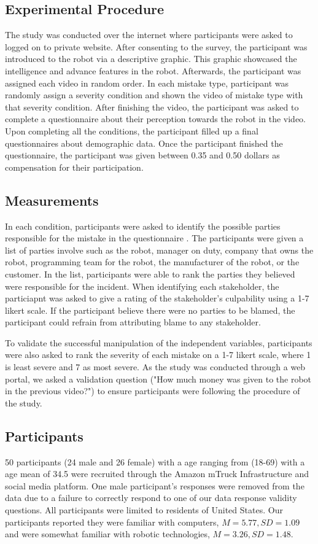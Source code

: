 \documentclass{sigchi}
\begin{document}
\subsection{Experimental Procedure}
The study was conducted over the internet where participants were asked to logged on to private website. After consenting to the survey, the participant was introduced to the robot via a descriptive graphic. This graphic showcased the intelligence and advance features in the robot. Afterwards, the participant was assigned each video in random order. In each mistake type, participant was randomly assign a severity condition and shown the video of mistake type with that severity condition. After finishing the video, the participant was asked to complete a questionnaire about their perception towards the robot in the video. Upon completing all the conditions, the participant filled up a final questionnaires about demographic data. Once the participant finished the questionnaire, the participant was given between 0.35 and 0.50 dollars as compensation for their participation.

\subsection{Measurements}
In each condition, participants were asked to identify the possible parties responsible for the mistake in the questionnaire . The participants were given a list of parties involve such as the robot, manager on duty, company that owns the robot, programming team for the robot, the manufacturer of the robot, or the customer. In the list, participants were able to rank the parties they believed were responsible for the incident. When identifying each stakeholder, the particiapnt was asked to give a rating of the stakeholder's culpability using a 1-7 likert scale. If the participant believe there were no parties to be blamed, the participant could refrain from attributing blame to any stakeholder. 

To validate the successful manipulation of the independent variables, participants were also asked to rank the severity of each mistake on a 1-7 likert scale, where 1 is least severe and 7 as most severe. As the study was conducted through a web portal, we asked a validation question ("How much money was given to the robot in the previous video?") to ensure participants were following the procedure of the study.

\subsection{Participants}
50 participants (24 male and 26 female) with a age ranging from (18-69) with a age mean of 34.5 were recruited through the Amazon mTruck Infrastructure and social media platform. One male participant's responses were removed from the data due to a failure to correctly respond to one of our data response validity questions. All participants were limited to residents of United States. Our participants reported they were familiar with computers, $M=5.77, SD=1.09$ and were somewhat familiar with robotic technologies, $M=3.26, SD=1.48$.
\end{document}
